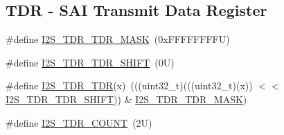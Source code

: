 \subsection*{T\+DR -\/ S\+AI Transmit Data Register}
\begin{DoxyCompactItemize}
\item 
\#define \mbox{\hyperlink{group___i2_s___register___masks_gaa3e1fe9a61d8485d2d6968dfcf779502}{I2\+S\+\_\+\+T\+D\+R\+\_\+\+T\+D\+R\+\_\+\+M\+A\+SK}}~(0x\+F\+F\+F\+F\+F\+F\+F\+F\+U)
\item 
\#define \mbox{\hyperlink{group___i2_s___register___masks_gacf46b25f4f14b34413430bc2071c1a13}{I2\+S\+\_\+\+T\+D\+R\+\_\+\+T\+D\+R\+\_\+\+S\+H\+I\+FT}}~(0\+U)
\item 
\#define \mbox{\hyperlink{group___i2_s___register___masks_gabe6f8f2157a35e011d88193360f25f94}{I2\+S\+\_\+\+T\+D\+R\+\_\+\+T\+DR}}(x)~(((uint32\+\_\+t)(((uint32\+\_\+t)(x)) $<$$<$ \mbox{\hyperlink{group___i2_s___register___masks_gacf46b25f4f14b34413430bc2071c1a13}{I2\+S\+\_\+\+T\+D\+R\+\_\+\+T\+D\+R\+\_\+\+S\+H\+I\+FT}})) \& \mbox{\hyperlink{group___i2_s___register___masks_gaa3e1fe9a61d8485d2d6968dfcf779502}{I2\+S\+\_\+\+T\+D\+R\+\_\+\+T\+D\+R\+\_\+\+M\+A\+SK}})
\item 
\#define \mbox{\hyperlink{group___i2_s___register___masks_gabc61a36a7417bd6953f629a9e758b51a}{I2\+S\+\_\+\+T\+D\+R\+\_\+\+C\+O\+U\+NT}}~(2\+U)
\end{DoxyCompactItemize}
